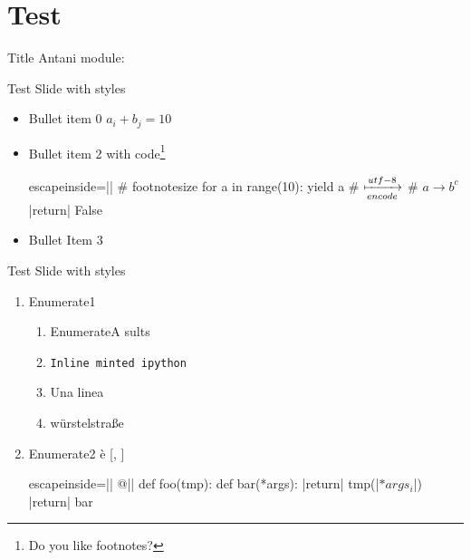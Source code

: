 \section{Test}
\usepackage{pdfcomment}

\begin{pyframe}{Title}
Antani
module: 
\end{pyframe}

\begin{pyframe}{Test Slide with styles}
\begin{itemize}
\item Bullet  item 0 $a_i + b_j = 10 $
\item Bullet  item 2 with code\footnote{Do you like footnotes?}
\begin{pycode*}{escapeinside=||}
    # footnotesize
    for  a in range(10):
        yield a
    # $\xmapsto[encode]{utf-8}$
    # $a \rightarrow b^{c}$
    |return| False
\end{pycode*}
\item Bullet Item 3 
\end{itemize}
\end{pyframe}

\begin{pyframe}{Test Slide with styles}
\begin{enumerate}
\item Enumerate1  
    \begin{enumerate}
    \item EnumerateA  sults
    \item \texttt{Inline minted ipython}
    \item Una linea 
    \item w\"urstelstra\ss e
    \end{enumerate}

\item Enumerate2 \`{e} 
 [, ] 
\begin{pycode*}{escapeinside=||}
@||
def foo(tmp):
    def bar(*args):
        |return| tmp(|$*args_{i}$|)
    |return| bar
\end{pycode*}

\end{enumerate}

\end{pyframe}

